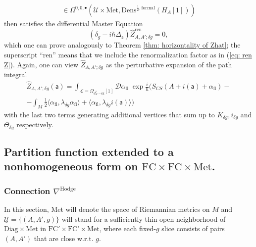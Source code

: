 \documentclass[11pt,a4paper]{amsart}
\theoremstyle{plain} %
\theoremstyle{definition}
\theoremstyle{remark}
\newcommand{\mr}{\mathrm}
\newcommand{\sfa}{\mathsf{a}}
\newcommand{\bt}{\bullet}
\newcommand{\wh}{\widehat}
\newcommand{\mc}{\mathcal}
\newcommand{\FC}{\mathrm{FC}}
\newcommand{\UU}{\underline{\mc{U}}}
\begin{document}
{\begin{multline}
    \in \Omega^{0,0,\bt}(\mc{U}\times \mr{Met},\mr{Dens}^{\frac12,\mr{formal}}(H_A [1]))
\end{multline}
then satisfies the differential Master Equation 
\begin{equation}\label{dQME on Zhat g}
    (\delta_g - i\hbar\Delta_\sfa)\wh{Z}_{A,A';\delta g}^\mr{ren} = 0,
\end{equation}
which one can prove analogously to Theorem \ref{thm: horizontality of Zhat}; the superscript ``ren'' means that we include the renormalization factor as in (\ref{eq: ren Z}). Again, one can view $\wh{Z}_{A,A';\delta g}$ as the perturbative expansion of the path integral
\begin{multline}\label{Zhat g as path integral}
    \wh{Z}_{A,A';\delta g}(\sfa)=\int_{\mc{L}=\Omega_{d^*_{A'}\mr{-ex}}[1]}\mc{D}\alpha_\mr{fl}
    \; \exp \frac{i}{\hbar}\Big( 
    S_{CS}(A+i(\sfa)+\alpha_\mr{fl})
    - \\ -\int_M\frac12 \big\langle 
    \alpha_\mr{fl}, \lambda_{\delta g}\alpha_\mr{fl}
    \big\rangle+\big\langle \alpha_\mr{fl},\lambda_{\delta g} i(\sfa) \big\rangle
    \Big)
\end{multline}
with the last two terms generating additional vertices that sum up to $K_{\delta g}, i_{\delta g}$ and $\Theta_{\delta g}$ respectively.


\subsection{Partition function extended to a nonhomogeneous form %
on $\FC\times \FC\times \mr{Met}$. %
}
\label{ss: full extension of Z}
\subsubsection{Connection $\nabla^\mr{Hodge}$}
In this section, $\mr{Met}$ will denote the space of Riemannian metrics on $M$ and $\UU=\{(A,A',g)\}$ will stand for a sufficiently 
thin open neighborhood of $\mr{Diag}\times\mr{Met}$ in $\FC'\times\FC'\times \mr{Met}$, where each fixed-$g$ slice consists of pairs $(A,A')$ that are close w.r.t. $g$. 


}
\end{document}
